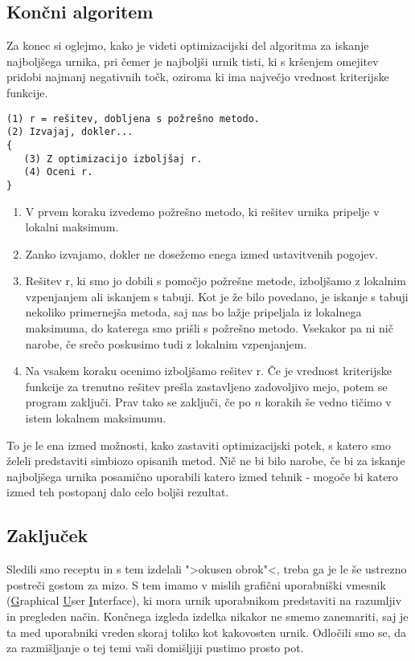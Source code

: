 \documentclass[a4paper,10pt]{article}
\begin{document}
\subsection{Končni algoritem}
Za konec si oglejmo, kako je videti optimizacijski del algoritma za iskanje najboljšega
urnika, pri čemer je najboljši urnik tisti, ki s kršenjem omejitev pridobi najmanj negativnih
točk, oziroma ki ima največjo vrednost kriterijske funkcije.
\begin{verbatim}
(1) r = rešitev, dobljena s požrešno metodo.
(2) Izvajaj, dokler...
{
   (3) Z optimizacijo izboljšaj r.
   (4) Oceni r.
}
\end{verbatim}
\begin{enumerate}
\item V prvem koraku izvedemo požrešno metodo, ki rešitev urnika pripelje v lokalni maksimum.

\item Zanko izvajamo, dokler ne dosežemo enega izmed ustavitvenih pogojev.

\item Rešitev r, ki smo jo dobili s pomočjo požrešne metode, izboljšamo z lokalnim vzpenjanjem
ali iskanjem s tabuji. Kot je že bilo povedano, je iskanje s tabuji nekoliko primernejša metoda,
saj nas bo lažje pripeljala iz lokalnega maksimuma, do katerega smo prišli s požrešno metodo.
Vsekakor pa ni nič narobe, če srečo poskusimo tudi z lokalnim vzpenjanjem.

\item Na vsakem koraku ocenimo izboljšamo rešitev r. Če je vrednost kriterijske funkcije
za trenutno rešitev prešla zastavljeno zadovoljivo mejo, potem se program zaključi. Prav tako
se zaključi, če po $n$ korakih še vedno tičimo v istem lokalnem maksimumu.
\end{enumerate}
To je le ena izmed možnosti, kako zastaviti optimizacijski potek, s katero smo želeli predstaviti
simbiozo opisanih metod. Nič ne bi bilo narobe, če bi za iskanje najboljšega urnika posamično
uporabili katero izmed tehnik - mogoče bi katero izmed teh postopanj dalo celo boljši rezultat.
\subsection{Zaključek}
Sledili smo receptu in s tem izdelali ">okusen obrok"<, treba ga je le še ustrezno postreči
gostom za mizo. S tem imamo v mislih grafični uporabniški vmesnik (\underline{G}raphical
\underline{U}ser \underline{I}nterface), ki mora urnik uporabnikom predstaviti na razumljiv in
pregleden način. Končnega izgleda izdelka nikakor ne smemo zanemariti, saj je ta med uporabniki
vreden skoraj toliko kot kakovosten urnik. Odločili smo se, da za razmišljanje o tej temi vaši
domišljiji pustimo prosto pot.
\end{document}

